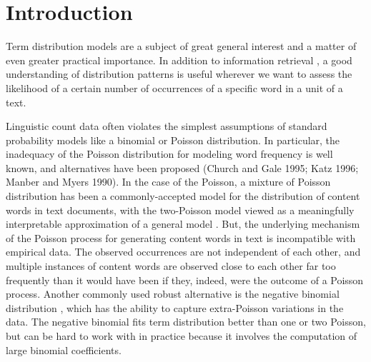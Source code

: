 \documentclass[english]{jnlp_1.4_rep}
\begin{document}
\maketitle

\section{Introduction}

Term distribution models are a subject of great general interest and a matter of even greater practical importance. In addition to information
retrieval \cite{Robertson80}, a good understanding of distribution patterns is useful wherever we want to assess the likelihood of a certain number
of occurrences of a specific word in a unit of a text.

Linguistic count data often violates the simplest assumptions of 
\pagebreak
standard probability models like a binomial or Poisson distribution. In particular,
the inadequacy of the Poisson distribution for modeling word frequency is well known, and alternatives have been proposed 
    (Church and Gale 1995; Katz 1996; Manber and Myers 1990)\nocite{Manber90}. 
In the case of the Poisson, a mixture of Poisson distribution has been a
commonly-accepted model for the distribution of content words in text documents, with the two-Poisson model viewed as a meaningfully interpretable
approximation of a general model \cite{Robertson94}. But, the underlying mechanism of the Poisson process for generating content words in text is
incompatible with empirical data. The observed occurrences are not independent of each other, and multiple instances of content words are observed
close to each other far too frequently than it would have been if they, indeed, were the outcome of a Poisson process. Another commonly used robust
alternative is the negative binomial distribution \cite{Church95}, which has the ability to capture extra-Poisson variations in the data. The
negative binomial fits term distribution better than one or two Poisson, but can be hard to work with in practice because it involves the
computation of large binomial coefficients.
\end{document}
